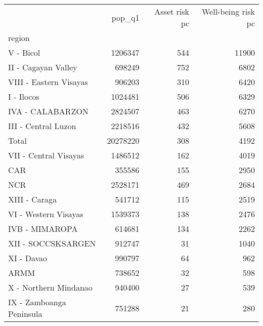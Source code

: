 \begin{tabular}{lrrr}
\toprule
{} &    pop\_q1 &  Asset risk pc &  Well-being risk pc \\
region                   &           &                &                     \\
\midrule
V - Bicol                &   1206347 &            544 &               11900 \\
II - Cagayan Valley      &    698249 &            752 &                6802 \\
VIII - Eastern Visayas   &    906203 &            310 &                6420 \\
I - Ilocos               &   1024481 &            506 &                6329 \\
IVA - CALABARZON         &   2824507 &            463 &                6270 \\
III - Central Luzon      &   2218516 &            432 &                5608 \\
Total                    &  20278220 &            308 &                4192 \\
VII - Central Visayas    &   1486512 &            162 &                4019 \\
CAR                      &    355586 &            155 &                2950 \\
NCR                      &   2528171 &            469 &                2684 \\
XIII - Caraga            &    541712 &            115 &                2519 \\
VI - Western Visayas     &   1539373 &            138 &                2476 \\
IVB - MIMAROPA           &    614681 &            134 &                2262 \\
XII - SOCCSKSARGEN       &    912747 &             31 &                1040 \\
XI - Davao               &    990797 &             64 &                 962 \\
ARMM                     &    738652 &             32 &                 598 \\
X - Northern Mindanao    &    940400 &             27 &                 539 \\
IX - Zamboanga Peninsula &    751288 &             21 &                 280 \\
\bottomrule
\end{tabular}
